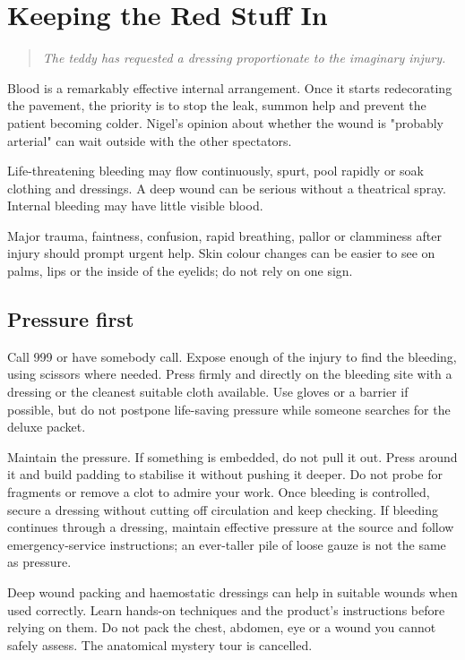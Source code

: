 \documentclass[10pt,openright]{book}
\begin{document}
\chapter{Keeping the Red Stuff In}
\begin{quote}\emph{The teddy has requested a dressing proportionate to the imaginary injury.}\end{quote}
Blood is a remarkably effective internal arrangement. Once it starts redecorating the pavement, the priority is to stop the leak, summon help and prevent the patient becoming colder. Nigel's opinion about whether the wound is "probably arterial" can wait outside with the other spectators.

Life-threatening bleeding may flow continuously, spurt, pool rapidly or soak clothing and dressings. A deep wound can be serious without a theatrical spray. Internal bleeding may have little visible blood.

Major trauma, faintness, confusion, rapid breathing, pallor or clamminess after injury should prompt urgent help. Skin colour changes can be easier to see on palms, lips or the inside of the eyelids; do not rely on one sign.

\section*{Pressure first}
Call 999 or have somebody call. Expose enough of the injury to find the bleeding, using scissors where needed. Press firmly and directly on the bleeding site with a dressing or the cleanest suitable cloth available. Use gloves or a barrier if possible, but do not postpone life-saving pressure while someone searches for the deluxe packet.

Maintain the pressure. If something is embedded, do not pull it out. Press around it and build padding to stabilise it without pushing it deeper. Do not probe for fragments or remove a clot to admire your work. Once bleeding is controlled, secure a dressing without cutting off circulation and keep checking. If bleeding continues through a dressing, maintain effective pressure at the source and follow emergency-service instructions; an ever-taller pile of loose gauze is not the same as pressure.

Deep wound packing and haemostatic dressings can help in suitable wounds when used correctly. Learn hands-on techniques and the product's instructions before relying on them. Do not pack the chest, abdomen, eye or a wound you cannot safely assess. The anatomical mystery tour is cancelled.
\end{document}
